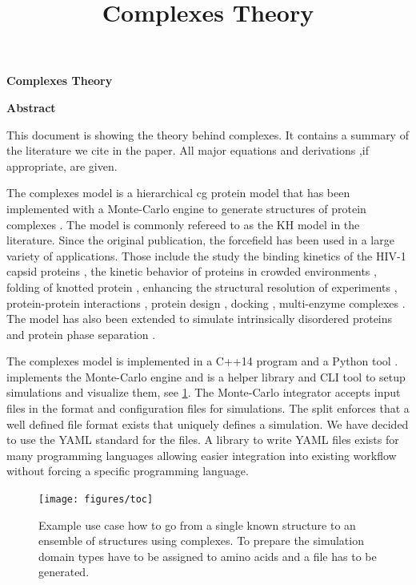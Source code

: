 \documentclass[12pt, twoside]{report}
\begin{document}
\title{Complexes Theory}
\titlepage

\thispagestyle{plain}
\begin{center}
    \Large
    \textbf{Complexes Theory}
       
    \vspace{0.9cm}
    \textbf{Abstract}
\end{center}
This document is showing the theory behind complexes. It contains a summary
of the literature we cite in the paper. All major equations and derivations
,if appropriate, are given. 

\tableofcontents


The complexes model is a hierarchical \gls{cg} protein model that has been
implemented with a Monte-Carlo engine to generate structures of protein
complexes \cite{Kim2008}. The model is commonly refereed to as the \gls{KH}
model in the literature. Since the original publication, the forcefield has been
used in a large variety of applications. Those include the study the binding
kinetics of the HIV-1 capsid proteins \cite{Zhu2015, Sha2017}, the kinetic
behavior of proteins in crowded environments \cite{Kim2013, Kim2010a, Rosen2011,
  Dignon2018a}, folding of knotted protein \cite{Skrbic2012, ABeccara2013,
  Sirur2013, Covino2014a, Sirur2016, Covino2013}, enhancing the structural
resolution of experiments \cite{Rozycki2011, Kofinger2015, Baumlova2014,
  Rozycki2015, Chalupska2017}, protein-protein interactions \cite{Okazaki2012,
  Malinverni2017, Ravikumar2012}, protein design \cite{Yadahalli2014}, docking
\cite{Fortoul2015}, multi-enzyme complexes \cite{Rozycki2017, N2018, Horan2018,
  Rozycki2016}. The model has also been extended to simulate intrinsically
disordered proteins and protein phase separation \cite{Dignon2018a}.

The complexes model is implemented in a \mbox{C++14} program \complexes and a
\mbox{Python} tool \pycomplexes. \complexes implements the Monte-Carlo engine
and \pycomplexes is a helper library and \gls{CLI} tool to setup simulations and
visualize them, see \cref{fig:toc}. The Monte-Carlo integrator accepts input
files in the \cplx format and configuration files for simulations. The split
enforces that a well defined file format exists that uniquely defines a
simulation. We have decided to use the YAML standard \cite{YAML} for the \cplx
files. A library to write YAML files exists for many programming languages
allowing easier integration into existing workflow without forcing a specific
programming language.

\begin{figure}[!ht] \centering
\texttt{[image: figures/toc]}
\caption[\complexes use-case example.]{Example use case how to go from a single
known structure to an ensemble of structures using complexes. To prepare the
simulation domain types have to be assigned to amino acids and a \cplx file has
to be generated.}
\label{fig:toc}
\end{figure}
\end{document}
